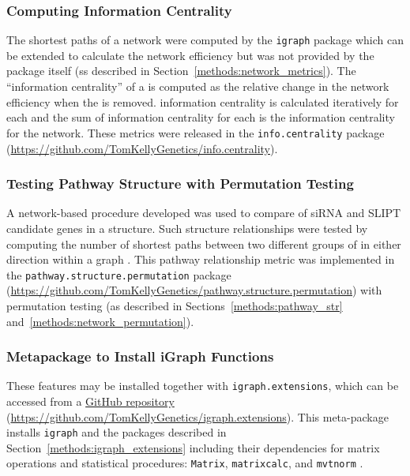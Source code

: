 \FloatBarrier
 
\subsubsection{Computing Information Centrality} 
The \glspl{shortest path} of a network were computed by the \texttt{igraph} package \citep{igraph} which can be extended to calculate the network efficiency but was not provided by the package itself (ss described in Section~\ref{methods:network_metrics}). The ``\gls{information centrality}'' of a  is computed as the relative change in the network efficiency when the  is removed. \Gls{information centrality} is calculated iteratively for each  and the sum of \gls{information centrality} for each  is the \gls{information centrality} for the network. These metrics were released in the \texttt{info.centrality} package (\url{https://github.com/TomKellyGenetics/info.centrality}).

\subsubsection{Testing Pathway Structure with Permutation Testing}
A network-based procedure developed was used to compare of \gls{siRNA} and \gls{SLIPT} candidate genes in a  structure. Such  structure relationships were tested by computing the number of \glspl{shortest path} between two different groups of  in either direction within a graph . This pathway relationship metric was implemented in the \texttt{pathway.structure.permutation} package (\url{https://github.com/TomKellyGenetics/pathway.structure.permutation}) with permutation testing (as described in Sections~\ref{methods:pathway_str} and~\ref{methods:network_permutation}). 

\subsubsection{Metapackage to Install iGraph Functions}
These features may be installed together with \texttt{igraph.extensions}, which can be accessed from a \href{https://github.com/TomKellyGenetics/igraph.extensions}{GitHub repository} (\url{https://github.com/TomKellyGenetics/igraph.extensions}). This meta-package installs \texttt{igraph} \citep{igraph} and the packages described in Section~\ref{methods:igraph_extensions} including their dependencies for matrix operations and statistical procedures: \texttt{Matrix}, \texttt{matrixcalc}, and \texttt{mvtnorm} \citep{Matrix, matrixcalc, Genz2009, mvtnorm}.


